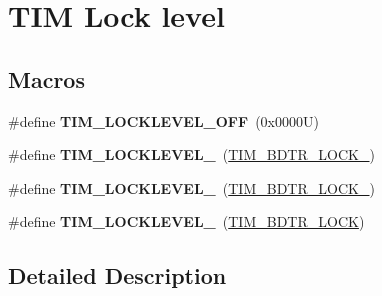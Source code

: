 \hypertarget{group___t_i_m___lock__level}{}\section{T\+IM Lock level}
\label{group___t_i_m___lock__level}
\subsection*{Macros}
\begin{DoxyCompactItemize}
\item 
\mbox{\label{group___t_i_m___lock__level_ga304aece56a9391a4d9b1016144d98fbd}} 
\#define {\bfseries T\+I\+M\+\_\+\+L\+O\+C\+K\+L\+E\+V\+E\+L\+\_\+\+O\+FF}~(0x0000\+U)
\item 
\mbox{\label{group___t_i_m___lock__level_ga46dc7705788ba2ce5135c43b998ef4dd}} 
\#define {\bfseries T\+I\+M\+\_\+\+L\+O\+C\+K\+L\+E\+V\+E\+L\+\_}~(\hyperlink{group___peripheral___registers___bits___definition_gabbd1736c8172e7cd098bb591264b07bf}{T\+I\+M\+\_\+\+B\+D\+T\+R\+\_\+\+L\+O\+C\+K\+\_})
\item 
\mbox{\label{group___t_i_m___lock__level_ga03a5ed2aded43ccfe7ab12a9dd53d251}} 
\#define {\bfseries T\+I\+M\+\_\+\+L\+O\+C\+K\+L\+E\+V\+E\+L\+\_}~(\hyperlink{group___peripheral___registers___bits___definition_ga756df80ff8c34399435f52dca18e6eee}{T\+I\+M\+\_\+\+B\+D\+T\+R\+\_\+\+L\+O\+C\+K\+\_})
\item 
\mbox{\label{group___t_i_m___lock__level_gaa1afed375c27151608e388fdf4a57a13}} 
\#define {\bfseries T\+I\+M\+\_\+\+L\+O\+C\+K\+L\+E\+V\+E\+L\+\_}~(\hyperlink{group___peripheral___registers___bits___definition_ga7e4215d17f0548dfcf0b15fe4d0f4651}{T\+I\+M\+\_\+\+B\+D\+T\+R\+\_\+\+L\+O\+CK})
\end{DoxyCompactItemize}


\subsection{Detailed Description}
